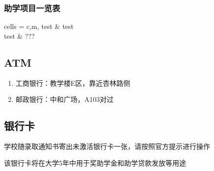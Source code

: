 \subsubsection[助学项目一览表]{助学项目一览表}
\begin{tblr}[
        long,
        theme = {no-caption},
    ]{
        cells  = {c,m},
    }
    test & test \\
    test & ???
\end{tblr}

\subsection[ATM]{ATM\footnotemark}
\begin{enumerate}
    \item 工商银行：教学楼E区，靠近杏林路侧
    \item 邮政银行：中和广场，A103对过
\end{enumerate}

\subsection[银行卡]{银行卡}
学校随录取通知书寄出未激活银行卡一张，请按照官方提示进行操作

该银行卡将在大学5年中用于奖助学金和助学贷款发放等用途
